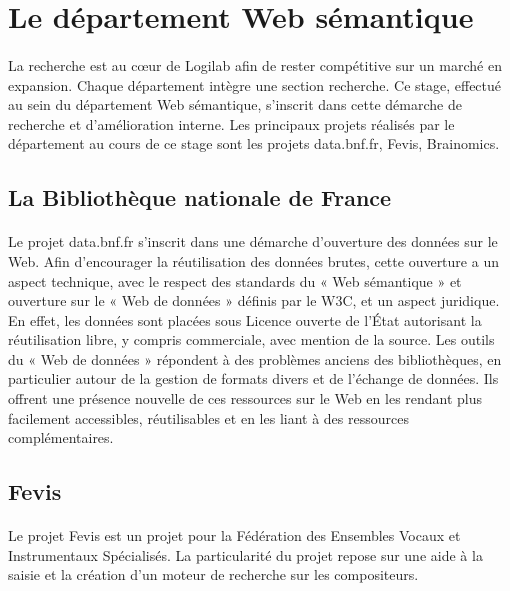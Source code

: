 \documentclass {report}
\begin{document}
\section{Le département Web sémantique}
\paragraph{}
La recherche est au cœur de Logilab afin de rester compétitive sur un marché en expansion. Chaque département intègre une section recherche. Ce stage, effectué au sein du département Web sémantique, s'inscrit dans cette démarche de recherche et d'amélioration interne. Les principaux projets réalisés par le département au cours de ce stage sont les projets data.bnf.fr, Fevis, Brainomics.

\subsection{La Bibliothèque nationale de France}
\paragraph{}
Le projet data.bnf.fr s'inscrit dans une démarche d'ouverture des données sur le Web. Afin d’encourager la réutilisation des données brutes, cette ouverture a un aspect technique, avec le respect des standards du « Web sémantique » et ouverture sur le « Web de données » définis par le W3C, et un aspect juridique. En effet, les données sont placées sous Licence ouverte de l’État autorisant la réutilisation libre, y compris commerciale, avec mention de la source. Les outils du « Web de données » répondent à des problèmes anciens des bibliothèques, en particulier autour de la gestion de formats divers et de l’échange de données. Ils offrent une présence nouvelle de ces ressources sur le Web en les rendant plus facilement accessibles, réutilisables et en les liant à des ressources complémentaires.


\subsection{Fevis}
\paragraph{}
Le projet Fevis est un projet pour la Fédération des Ensembles Vocaux et Instrumentaux Spécialisés. La particularité du projet repose sur une aide à la saisie et la création d'un moteur de recherche sur les compositeurs. 
\end{document}
